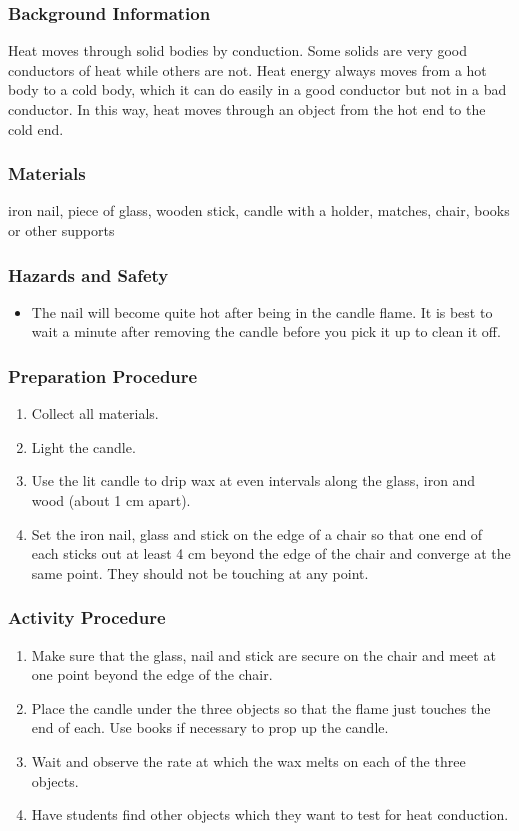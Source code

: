 \subsubsection*{Background Information}
Heat moves through solid bodies by conduction. Some solids are very good conductors of heat while others are not. Heat energy always moves from a hot body to a cold body, which it can do easily in a good conductor but not in a bad conductor. In this way, heat moves through an object from the hot end to the cold end.  

\subsubsection*{Materials}
iron nail, piece of glass, wooden stick, candle with a holder, matches, chair, books or other supports

\subsubsection*{Hazards and Safety}
\begin{itemize}
\item{The nail will become quite hot after being in the candle flame. It is best to wait a minute after removing the candle before you pick it up to clean it off.} 
\end{itemize}

\subsubsection*{Preparation Procedure}
\begin{enumerate}
\item{Collect all materials.} 
\item{Light the candle.} 
\item{Use the lit candle to drip wax at even intervals along the glass, iron and wood (about 1 cm apart).} 
\item{Set the iron nail, glass and stick on the edge of a chair so that one end of each sticks out at least 4 cm beyond the edge of the chair and converge at the same point. They should not be touching at any point.} 
\end{enumerate}

\subsubsection*{Activity Procedure}
\begin{enumerate}
\item{Make sure that the glass, nail and stick are secure on the chair and meet at one point beyond the edge of the chair.} 
\item{Place the candle under the three objects so that the flame just touches the end of each. Use books if necessary to prop up the candle.} 
\item{Wait and observe the rate at which the wax melts on each of the three objects.} 
\item{Have students find other objects which they want to test for heat conduction.} 
\end{enumerate}

